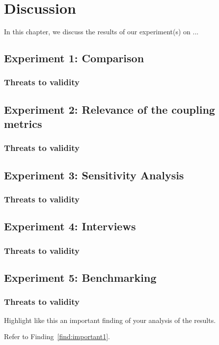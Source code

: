 \chapter{Discussion}\label{ch:Discussion}
In this chapter, we discuss the results of our experiment(s) on ...

\section{Experiment 1: Comparison}

\subsection{Threats to validity}

\section{Experiment 2: Relevance of the coupling metrics}

\subsection{Threats to validity}

\section{Experiment 3: Sensitivity Analysis}

\subsection{Threats to validity}

\section{Experiment 4: Interviews}

\subsection{Threats to validity}

\section{Experiment 5: Benchmarking}

\subsection{Threats to validity}
\begin{finding}
	Highlight like this an important finding of your analysis of the results.
	\label{find:important1}
\end{finding}

Refer to Finding~\ref{find:important1}.
